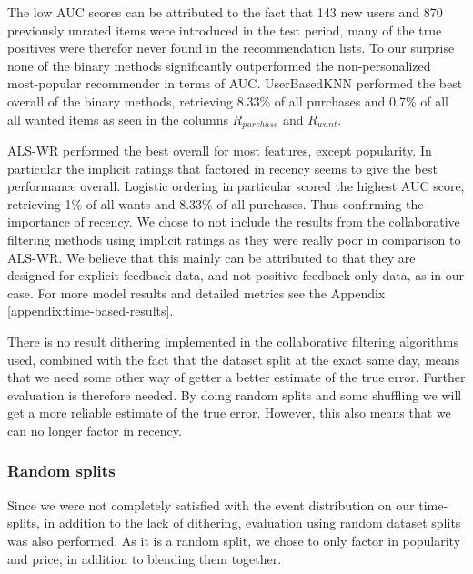 The low AUC scores can be attributed to the fact that 143 new users and 870 previously unrated items were introduced in the test period, many of the true positives
were therefor never found in the recommendation lists. To our surprise none of the binary methods significantly outperformed the
non-personalized most-popular recommender in terms of AUC. UserBasedKNN performed the best overall of the binary methods, retrieving 8.33\% of all purchases
and 0.7\% of all all wanted items as seen in the columns $R_{purchase}$ and $R_{want}$.

ALS-WR performed the best overall for most features, except popularity. In particular the implicit ratings that factored in recency seems
to give the best performance overall. Logistic ordering in particular scored the highest AUC score, retrieving 1\% of all wants and 8.33\% of all purchases.
Thus confirming the importance of recency. We chose to not include the results from the collaborative filtering methods using implicit
ratings as they were really poor in comparison to ALS-WR. We believe that this mainly can be attributed to that they are designed for explicit feedback data,
and not positive feedback only data, as in our case. For more model results and detailed metrics see the Appendix \ref{appendix:time-based-results}.

There is no result dithering implemented in the collaborative filtering algorithms used, combined with the fact that the dataset split at the exact same day,
means that we need some other way of getter a better estimate of the true error. Further evaluation is therefore needed.
By doing random splits and some shuffling we will get a more reliable estimate of the true error. However, this also means that we can no longer factor in recency.

\subsubsection{Random splits}

Since we were not completely satisfied with the event distribution on our time-splits, in addition to the lack of dithering, evaluation using random
dataset splits was also performed. As it is a random split, we chose to only factor in popularity and price, in addition to blending them together.

